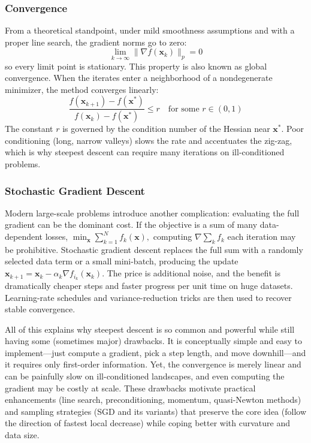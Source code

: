 \subsubsection{Convergence} From a theoretical standpoint, under mild smoothness assumptions and with a proper line search, the gradient norms go to zero:
\begin{equation}
\lim_{k\to\infty}\|\nabla f(\mathbf{x}_k)\|_p=0
\end{equation}
so every limit point is stationary. This property is also known as global convergence. When the iterates enter a neighborhood of a nondegenerate minimizer, the method converges linearly:
\begin{equation}
\frac{f(\mathbf{x}_{k+1})-f(\mathbf{x}^\ast)}{f(\mathbf{x}_k)-f(\mathbf{x}^\ast)}\le r
\quad\text{for some } r\in(0,1)
\end{equation}
The constant $r$ is governed by the condition number of the Hessian near $\mathbf{x}^\ast$. Poor conditioning (long, narrow valleys) slows the rate and accentuates the zig-zag, which is why steepest descent can require many iterations on ill-conditioned problems.

\subsubsection{Stochastic Gradient Descent} 
Modern large-scale problems introduce another complication: evaluating the full gradient can be the dominant cost. If the objective is a sum of many data-dependent losses, $\min_{\mathbf{x}}\sum_{k=1}^{N} f_k(\mathbf{x}),$ computing $\nabla \sum_k f_k$ each iteration may be prohibitive. Stochastic gradient descent replaces the full sum with a randomly selected data term or a small mini-batch, producing the update $\mathbf{x}_{k+1}=\mathbf{x}_k-\alpha_k \nabla f_{i_k}(\mathbf{x}_k)$. The price is additional noise, and the benefit is dramatically cheaper steps and faster progress per unit time on huge datasets. Learning-rate schedules and variance-reduction tricks are then used to recover stable convergence.

All of this explains why steepest descent is so common and powerful while still having some (sometimes major) drawbacks. It is conceptually simple and easy to implement---just compute a gradient, pick a step length, and move downhill---and it requires only first-order information. Yet, the convergence is merely linear and can be painfully slow on ill-conditioned landscapes, and even computing the gradient may be costly at scale. These drawbacks motivate practical enhancements (line search, preconditioning, momentum, quasi-Newton methods) and sampling strategies (SGD and its variants) that preserve the core idea (follow the direction of fastest local decrease) while coping better with curvature and data size.

